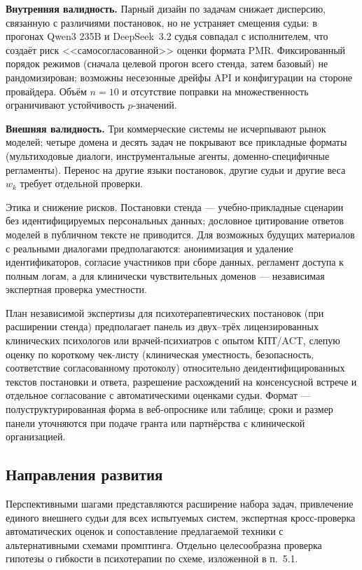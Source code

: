 \documentclass[a4paper,12pt]{article}
\begin{document}
\textbf{Внутренняя валидность.} Парный дизайн по задачам снижает дисперсию, связанную с различиями постановок, но не устраняет смещения судьи: в прогонах Qwen3 235B и DeepSeek~3.2 судья совпадал с исполнителем, что создаёт риск <<самосогласованной>> оценки формата PMR. Фиксированный порядок режимов (сначала целевой прогон всего стенда, затем базовый) не рандомизирован; возможны несезонные дрейфы API и конфигурации на стороне провайдера. Объём $n=10$ и отсутствие поправки на множественность ограничивают устойчивость $p$-значений.

\textbf{Внешняя валидность.} Три коммерческие системы не исчерпывают рынок моделей; четыре домена и десять задач не покрывают все прикладные форматы (мультиходовые диалоги, инструментальные агенты, доменно-специфичные регламенты). Перенос на другие языки постановок, другие судьи и другие веса $w_k$ требует отдельной проверки.

Этика и снижение рисков. Постановки стенда --- учебно-прикладные сценарии без идентифицируемых персональных данных; дословное цитирование ответов моделей в публичном тексте не приводится. Для возможных будущих материалов с реальными диалогами предполагаются: анонимизация и удаление идентификаторов, согласие участников при сборе данных, регламент доступа к полным логам, а для клинически чувствительных доменов --- независимая экспертная проверка уместности.

План независимой экспертизы для психотерапевтических постановок (при расширении стенда) предполагает панель из двух--трёх лицензированных клинических психологов или врачей-психиатров с опытом КПТ/ACT, слепую оценку по короткому чек-листу (клиническая уместность, безопасность, соответствие согласованному протоколу) относительно деидентифицированных текстов постановки и ответа, разрешение расхождений на консенсусной встрече и отдельное согласование с автоматическими оценками судьи. Формат --- полуструктурированная форма в веб-опроснике или таблице; сроки и размер панели уточняются при подаче гранта или партнёрства с клинической организацией.

\subsection{Направления развития}

Перспективными шагами представляются расширение набора задач, привлечение единого внешнего судьи для всех испытуемых систем, экспертная кросс-проверка автоматических оценок и сопоставление предлагаемой техники с альтернативными схемами промптинга. Отдельно целесообразна проверка гипотезы о гибкости в психотерапии по схеме, изложенной в п.~5.1.
\end{document}

